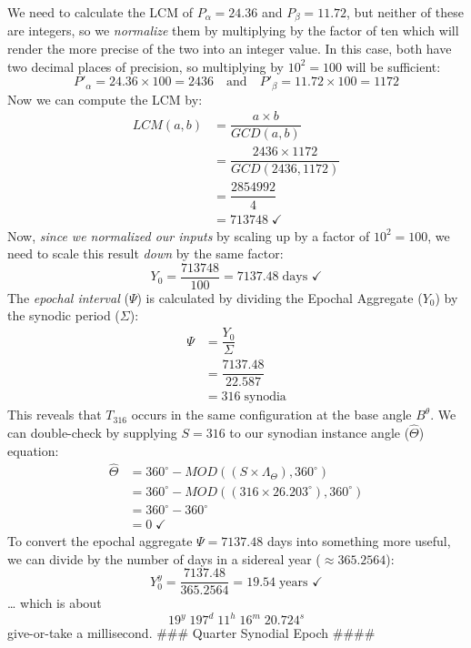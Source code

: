 \documentclass[
  letterpaper,
]{book}
\begin{document}
We need to calculate the LCM of \(P_\alpha = 24.36\) and
\(P_\beta = 11.72\), but neither of these are integers, so we
\emph{normalize} them by multiplying by the factor of ten which will
render the more precise of the two into an integer value. In this case,
both have two decimal places of precision, so multiplying by
\(10^2 = 100\) will be sufficient: \[
P'_\alpha = 24.36 \times 100 = 2436 \quad \text{and} \quad P'_\beta = 11.72 \times 100 = 1172
\] Now we can compute the LCM by: \[
\begin{equation}
\begin{split}
LCM(a, b) &= \dfrac{a \times b}{GCD(a, b)} \\[0.5em]
&= \dfrac{2436 \times 1172}{GCD(2436, 1172)} \\[0.5em]
&= \dfrac{2854992}{4} \\
&= 713748\; ✓
\end{split}
\end{equation}
\] Now, \emph{since we normalized our inputs} by scaling up by a factor
of \(10^2 = 100\), we need to scale this result \emph{down} by the same
factor: \[
Y_0 = \dfrac{713748}{100} = 7137.48\; \text{days } ✓
\] The \emph{epochal interval} (\(\Psi\)) is calculated by dividing the
Epochal Aggregate (\(Y_0\)) by the synodic period (\(\Sigma\)): \[
\begin{equation}
\begin{split}
\Psi &= \dfrac{Y_0}{\Sigma} \\[0.5em]
&= \dfrac{7137.48}{22.587} \\[0.5em]
&= 316\; \text{synodia}
\end{split}
\end{equation}
\] This reveals that \(T_{316}\) occurs in the same configuration at the
base angle \(B^\theta\). We can double-check by supplying \(S=316\) to
our synodian instance angle (\(\widehat{\Theta}\)) equation: \[
\begin{equation}
\begin{split}
\widehat{\Theta} &= 360^\circ - MOD((S \times \Lambda_\Theta), 360^\circ) \\
&= 360^\circ - MOD((316 \times 26.203^\circ), 360^\circ) \\
&= 360^\circ - 360^\circ \\
&= 0\; ✓
\end{split}
\end{equation}
\] To convert the epochal aggregate \(\Psi = 7137.48\) days into
something more useful, we can divide by the number of days in a sidereal
year (\(≈ 365.2564\)): \[
Y_0^y = \dfrac{7137.48}{365.2564} = 19.54\; \text{years }✓
\] \ldots{} which is about \[
19^y\;197^d\;11^h\;16^m\;20.724^s
\] give-or-take a millisecond. \#\#\# Quarter Synodial Epoch \#\#\#\#
\end{document}
